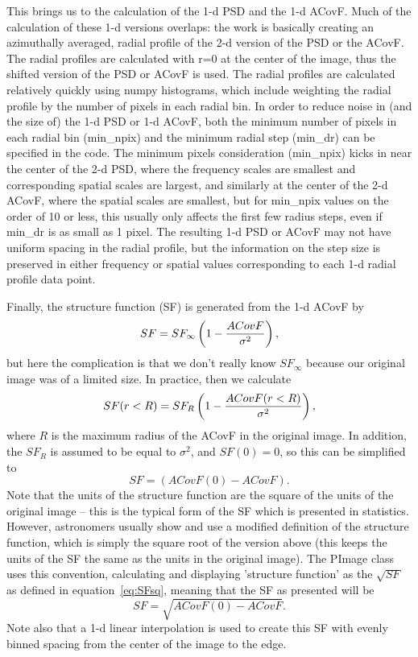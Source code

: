 \documentclass[11pt,preprint]{aastex}
\begin{document}
This brings us to the calculation of the 1-d PSD and the 1-d ACovF. Much of the calculation of these 1-d versions overlaps: the work is basically creating an azimuthally averaged, radial profile of the 2-d version of the PSD or the ACovF. The radial profiles are calculated with r=0 at the center of the image, thus the shifted version of the PSD or ACovF is used. The radial profiles are calculated relatively quickly using numpy histograms, which include weighting the radial profile by the number of pixels in each radial bin. In order to reduce noise in (and the size of) the 1-d PSD or 1-d ACovF, both the minimum number of pixels in each radial bin (min\_npix) and the minimum radial step (min\_dr) can be specified in the code. The minimum pixels consideration (min\_npix) kicks in near the center of the 2-d PSD, where the frequency scales are smallest and corresponding spatial scales are largest, and similarly at the center of the 2-d ACovF, where the spatial scales are smallest, but for min\_npix values on the order of 10 or less, this usually only affects the first few radius steps, even if min\_dr is as small as 1 pixel.  The resulting 1-d PSD or ACovF may not have uniform spacing in the radial profile, but the information on the step size is preserved in either frequency or spatial values corresponding to each 1-d radial profile data point. 

Finally, the structure function (SF) is generated from the 1-d ACovF by 
\begin{equation}
SF = SF_\infty \left( 1 - {ACovF \over \sigma^2} \right),
\end{equation}
but here the complication is that we don't really know $SF_\infty$ because our original image was of a limited size. In practice, then we calculate 
\begin{equation}
SF(r<R) = SF_R  \left( 1 - {ACovF(r<R) \over \sigma^2} \right),
\label{eq:SFsq}
\end{equation}
where $R$ is the maximum radius of the ACovF in the original image. In addition, the $SF_R$ is assumed to be equal to $\sigma^2$, and $SF(0) = 0$, so this can be simplified to 
\begin{equation}
SF = \left( ACovF(0) - ACovF \right).
\end{equation}
Note that the units of the structure function are the square of the units of the original image -- this is the typical form of the SF which is presented in statistics. However, astronomers usually show and use a modified definition of the structure function, which is simply the square root of the version above (this keeps the units of the SF the same as the units in the original image). The PImage class  uses this convention, calculating and displaying 'structure function' as the $\sqrt{SF}$ as defined in equation~\ref{eq:SFsq}, meaning that the SF as presented will be
\begin{equation}
SF = \sqrt{ACovF(0) - ACovF }. 
\label{eq:SF}
\end{equation}
Note also that a 1-d linear interpolation is used to create this SF with evenly binned spacing from the center of the image to the edge. 
\end{document}
